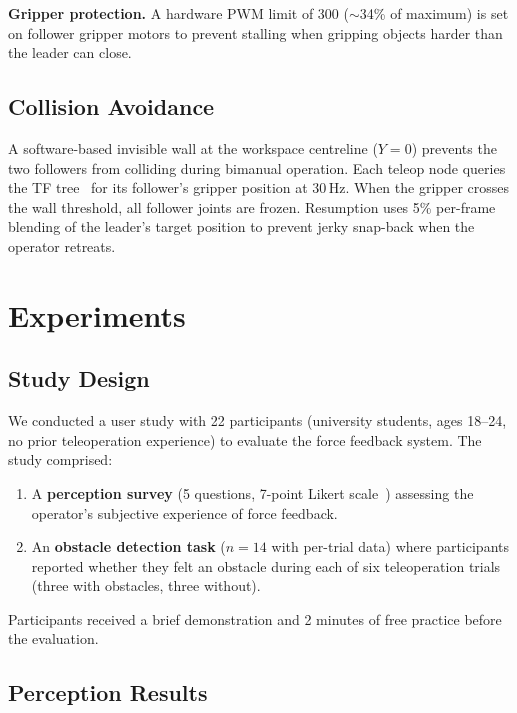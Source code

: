 \documentclass[conference]{IEEEtran}
\begin{document}
\textbf{Gripper protection.} A hardware PWM limit of 300 ($\sim$34\% of maximum) is set on follower gripper motors to prevent stalling when gripping objects harder than the leader can close.

\subsection{Collision Avoidance}

A software-based invisible wall at the workspace centreline ($Y = 0$) prevents the two followers from colliding during bimanual operation. Each teleop node queries the TF tree~\cite{foote2013tf} for its follower's gripper position at 30\,Hz. When the gripper crosses the wall threshold, all follower joints are frozen. Resumption uses 5\% per-frame blending of the leader's target position to prevent jerky snap-back when the operator retreats.

\section{Experiments}

\subsection{Study Design}

We conducted a user study with 22 participants (university students, ages 18--24, no prior teleoperation experience) to evaluate the force feedback system. The study comprised:

\begin{enumerate}
    \item A \textbf{perception survey} (5 questions, 7-point Likert scale~\cite{preston2000}) assessing the operator's subjective experience of force feedback.
    \item An \textbf{obstacle detection task} ($n = 14$ with per-trial data) where participants reported whether they felt an obstacle during each of six teleoperation trials (three with obstacles, three without).
\end{enumerate}

Participants received a brief demonstration and 2 minutes of free practice before the evaluation.

\subsection{Perception Results}
\end{document}
